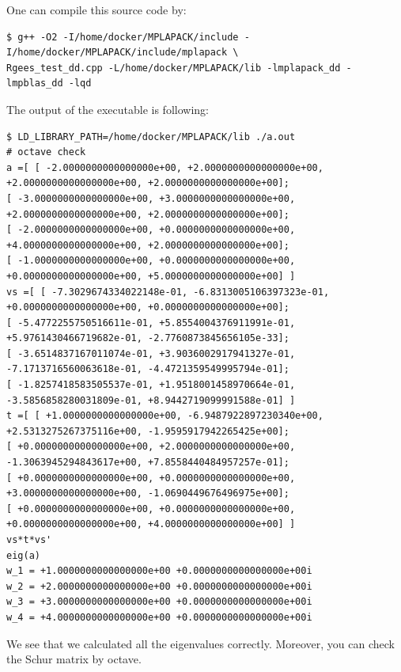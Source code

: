 \documentclass[12pt]{article}
\begin{document}
One can compile this source code by:
\begin{verbatim}
$ g++ -O2 -I/home/docker/MPLAPACK/include -I/home/docker/MPLAPACK/include/mplapack \
Rgees_test_dd.cpp -L/home/docker/MPLAPACK/lib -lmplapack_dd -lmpblas_dd -lqd
\end{verbatim}
The output of the executable is following:
{\footnotesize
\begin{verbatim}
$ LD_LIBRARY_PATH=/home/docker/MPLAPACK/lib ./a.out
# octave check
a =[ [ -2.0000000000000000e+00, +2.0000000000000000e+00, +2.0000000000000000e+00, +2.0000000000000000e+00]; 
[ -3.0000000000000000e+00, +3.0000000000000000e+00, +2.0000000000000000e+00, +2.0000000000000000e+00]; 
[ -2.0000000000000000e+00, +0.0000000000000000e+00, +4.0000000000000000e+00, +2.0000000000000000e+00]; 
[ -1.0000000000000000e+00, +0.0000000000000000e+00, +0.0000000000000000e+00, +5.0000000000000000e+00] ]
vs =[ [ -7.3029674334022148e-01, -6.8313005106397323e-01, +0.0000000000000000e+00, +0.0000000000000000e+00]; 
[ -5.4772255750516611e-01, +5.8554004376911991e-01, +5.9761430466719682e-01, -2.7760873845656105e-33]; 
[ -3.6514837167011074e-01, +3.9036002917941327e-01, -7.1713716560063618e-01, -4.4721359549995794e-01];
[ -1.8257418583505537e-01, +1.9518001458970664e-01, -3.5856858280031809e-01, +8.9442719099991588e-01] ]
t =[ [ +1.0000000000000000e+00, -6.9487922897230340e+00, +2.5313275267375116e+00, -1.9595917942265425e+00]; 
[ +0.0000000000000000e+00, +2.0000000000000000e+00, -1.3063945294843617e+00, +7.8558440484957257e-01];
[ +0.0000000000000000e+00, +0.0000000000000000e+00, +3.0000000000000000e+00, -1.0690449676496975e+00];
[ +0.0000000000000000e+00, +0.0000000000000000e+00, +0.0000000000000000e+00, +4.0000000000000000e+00] ]
vs*t*vs'
eig(a)
w_1 = +1.0000000000000000e+00 +0.0000000000000000e+00i
w_2 = +2.0000000000000000e+00 +0.0000000000000000e+00i
w_3 = +3.0000000000000000e+00 +0.0000000000000000e+00i
w_4 = +4.0000000000000000e+00 +0.0000000000000000e+00i
\end{verbatim}
}
We see that we calculated all the eigenvalues correctly. Moreover, you can check the Schur matrix by octave.
\end{document}
